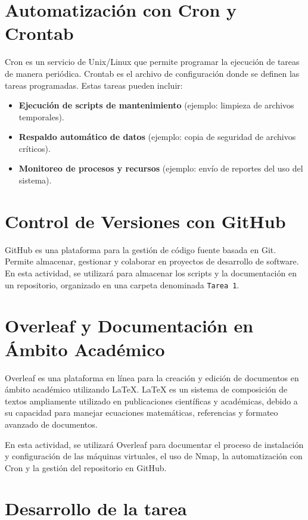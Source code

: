 \documentclass[conference]{IEEEtran}
\begin{document}
\section{Automatización con Cron y Crontab}
Cron es un servicio de Unix/Linux que permite programar la ejecución de tareas de manera periódica. Crontab es el archivo de configuración donde se definen las tareas programadas. Estas tareas pueden incluir:
\begin{itemize}
\item \textbf{Ejecución de scripts de mantenimiento} (ejemplo: limpieza de archivos temporales).
\item \textbf{Respaldo automático de datos} (ejemplo: copia de seguridad de archivos críticos).
\item \textbf{Monitoreo de procesos y recursos} (ejemplo: envío de reportes del uso del sistema).
\end{itemize}

\section{Control de Versiones con GitHub}
GitHub es una plataforma para la gestión de código fuente basada en Git. Permite almacenar, gestionar y colaborar en proyectos de desarrollo de software. En esta actividad, se utilizará para almacenar los scripts y la documentación en un repositorio, organizado en una carpeta denominada \texttt{Tarea 1}.

\section{Overleaf y Documentación en Ámbito Académico}
Overleaf es una plataforma en línea para la creación y edición de documentos en ámbito académico utilizando \LaTeX{}. \LaTeX{} es un sistema de composición de textos ampliamente utilizado en publicaciones científicas y académicas, debido a su capacidad para manejar ecuaciones matemáticas, referencias y formateo avanzado de documentos.

En esta actividad, se utilizará Overleaf para documentar el proceso de instalación y configuración de las máquinas virtuales, el uso de Nmap, la automatización con Cron y la gestión del repositorio en GitHub.

\section{Desarrollo de la tarea}\textbf{}
\end{document}
